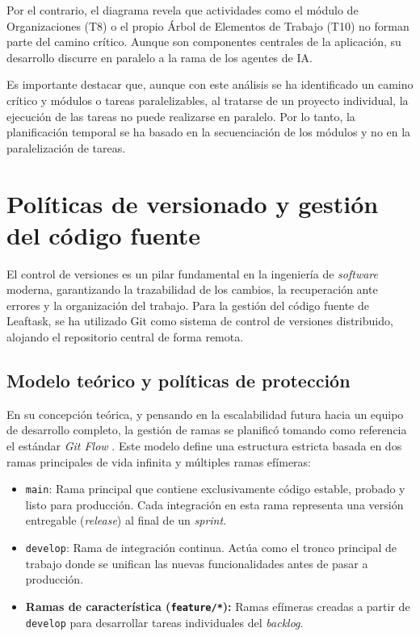 Por el contrario, el diagrama revela que actividades como el módulo de Organizaciones (T8) o el propio Árbol de Elementos de Trabajo (T10) no forman parte del camino crítico. Aunque son componentes centrales de la aplicación, su desarrollo discurre en paralelo a la rama de los agentes de IA.

Es importante destacar que, aunque con este análisis se ha identificado un camino crítico y módulos o tareas paralelizables, al tratarse de un proyecto individual, la ejecución de las tareas no puede realizarse en paralelo. Por lo tanto, la planificación temporal se ha basado en la secuenciación de los módulos y no en la paralelización de tareas.

\section{Políticas de versionado y gestión del código fuente}
El control de versiones es un pilar fundamental en la ingeniería de \emph{software} moderna, garantizando la trazabilidad de los cambios, la recuperación ante errores y la organización del trabajo. Para la gestión del código fuente de Leaftask, se ha utilizado Git como sistema de control de versiones distribuido, alojando el repositorio central de forma remota.

\subsection{Modelo teórico y políticas de protección}
En su concepción teórica, y pensando en la escalabilidad futura hacia un equipo de desarrollo completo, la gestión de ramas se planificó tomando como referencia el estándar \emph{Git Flow} \cite{driessen2010git}. Este modelo define una estructura estricta basada en dos ramas principales de vida infinita y múltiples ramas efímeras:
\begin{itemize}
    \item \texttt{main}: Rama principal que contiene exclusivamente código estable, probado y listo para producción. Cada integración en esta rama representa una versión entregable (\emph{release}) al final de un \emph{sprint}.
    \item \texttt{develop}: Rama de integración continua. Actúa como el tronco principal de trabajo donde se unifican las nuevas funcionalidades antes de pasar a producción.
    \item \textbf{Ramas de característica (\texttt{feature/*}):} Ramas efímeras creadas a partir de \texttt{develop} para desarrollar tareas individuales del \emph{backlog}.
\end{itemize}

